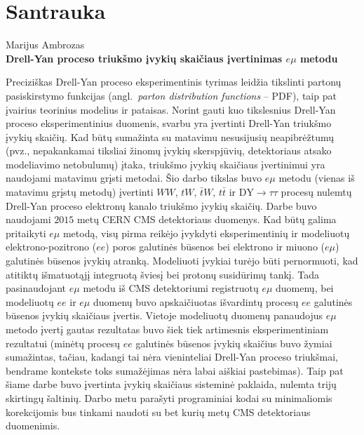 \documentclass[a4paper, 12pt]{article}
\newcommand{\WW}{W\! W}
\newcommand{\DYtau}{\mathrm{DY} \! \rightarrow \! \tau\tau}
\begin{document}
\clearpage



\clearpage
\section*{Santrauka}
\begin{centering}
Marijus Ambrozas\\
\textbf{Drell-Yan proceso triukšmo įvykių skaičiaus įvertinimas $e\mu$ metodu}\\
\end{centering}
\vspace{0.5cm}

Preciziškas Drell-Yan proceso eksperimentinis tyrimas leidžia tikslinti partonų pasiskirstymo funkcijas (angl.\ \textit{parton distribution functions} -- PDF), taip pat įvairius teorinius modelius ir pataisas. Norint gauti kuo tikslesnius Drell-Yan proceso eksperimentinius duomenis, svarbu yra įvertinti Drell-Yan triukšmo įvykių skaičių. Kad būtų sumažinta su matavimu nesusijusių neapibrėžtumų (pvz., nepakankamai tiksliai žinomų įvykių skerspjūvių, detektoriaus atsako modeliavimo netobulumų) įtaka, triukšmo įvykių skaičiaus įvertinimui yra naudojami matavimu grįsti metodai. Šio darbo tikslas buvo $e\mu$ metodu (vienas iš matavimu grįstų metodų) įvertinti $\WW$, $tW$, $\bar{t}W$, $t\bar{t}$ ir $\DYtau$ procesų nulemtų Drell-Yan proceso elektronų kanalo triukšmo įvykių skaičių. Darbe buvo naudojami $2015$ metų CERN CMS detektoriaus duomenys. Kad būtų galima pritaikyti $e\mu$ metodą, visų pirma reikėjo įvykdyti eksperimentinių ir modeliuotų elektrono-pozitrono ($ee$) poros galutinės būsenos bei elektrono ir miuono ($e\mu$) galutinės būsenos įvykių atranką. Modeliuoti įvykiai turėjo būti pernormuoti, kad atitiktų išmatuotąjį integruotą šviesį bei protonų susidūrimų tankį. Tada pasinaudojant $e\mu$ metodu iš CMS detektoriumi registruotų $e\mu$ duomenų, bei modeliuotų $ee$ ir $e\mu$ duomenų buvo apskaičiuotas išvardintų procesų $ee$ galutinės būsenos įvykių skaičiaus įvertis. Vietoje modeliuotų duomenų panaudojus $e\mu$ metodo įvertį gautas rezultatas buvo šiek tiek artimesnis eksperimentiniam rezultatui (minėtų procesų $ee$ galutinės būsenos įvykių skaičius buvo žymiai sumažintas, tačiau, kadangi tai nėra vieninteliai Drell-Yan proceso triukšmai, bendrame kontekste toks sumažėjimas nėra labai aiškiai pastebimas). Taip pat šiame darbe buvo įvertinta įvykių skaičiaus sisteminė paklaida, nulemta trijų skirtingų šaltinių. Darbo metu parašyti programiniai kodai su minimaliomis korekcijomis bus tinkami naudoti su bet kurių metų CMS detektoriaus duomenimis.
\end{document}
